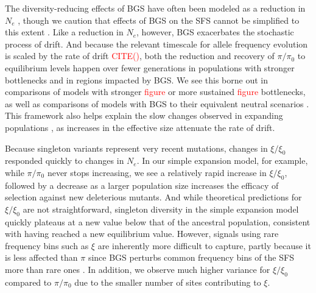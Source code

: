 \documentclass[9pt,twocolumn,twoside]{rilabRxiv}
\newcommand{\jri}[1]{{\small \textcolor{red}{#1}}}
\newcommand{\citex}[1]{{\small \textcolor{red}{CITE(#1)}}}
\begin{document}
The diversity-reducing effects of BGS have often been modeled as a reduction in $N_e$ \citep{charlesworth1993effect}, though we caution that effects of BGS on the SFS cannot be simplified to this extent \citep{cvijovic2018effect}.
Like a reduction in $N_e$, however, BGS exacerbates the stochastic process of drift.
And because the relevant timescale for allele frequency evolution is scaled by the rate of drift \citex{}, both the reduction and recovery of $\pi/\pi_0$ to equilibrium levels happen over fewer generations in populations with stronger bottlenecks and in regions impacted by BGS.
We see this borne out in comparisons of models with stronger \jri{figure} or more sustained \jri{figure} bottlenecks, as well as comparisons of models with BGS to their equivalent neutral scenarios .
This framework also helps explain the slow changes observed in expanding populations , as increases in the effective size attenuate the rate of drift.

Because singleton variants represent very recent mutations, changes in $\xi/\xi_0$ responded quickly to changes in $N_e$.  
In our simple expansion model, for example, while $\pi/\pi_0$ never stops increasing, we see a relatively rapid increase in $\xi/\xi_0$, followed by a decrease as a larger population size increases the efficacy of selection against new deleterious mutants. 
And while theoretical predictions for $\xi/\xi_0$ are not straightforward, singleton diversity in the simple expansion model quickly plateaus at a new value below that of the ancestral population, consistent with having reached a new equilibrium value.
However, signals using rare frequency bins such as $\xi$ are inherently more difficult to capture, partly because it is less affected than $\pi$ since BGS perturbs common frequency bins of the SFS more than rare ones \citep{cvijovic2018effect}.
In addition, we observe much higher variance  for $\xi/\xi_0$ compared to $\pi/\pi_0$ due to the smaller number of sites contributing to $\xi$. 
\end{document}
